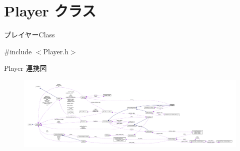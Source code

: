 \hypertarget{class_player}{}\section{Player クラス}
\label{class_player}


プレイヤー\+Class  




{\ttfamily \#include $<$Player.\+h$>$}



Player 連携図\nopagebreak
\begin{figure}[H]
\begin{center}
\leavevmode
\includegraphics[width=350pt]{class_player__coll__graph}
\end{center}
\end{figure}
